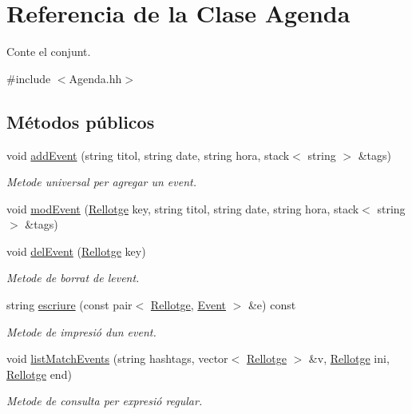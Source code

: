 \hypertarget{class_agenda}{}\section{Referencia de la Clase Agenda}
\label{class_agenda}


Conte el conjunt.  




{\ttfamily \#include $<$Agenda.\+hh$>$}

\subsection*{Métodos públicos}
\begin{DoxyCompactItemize}
\item 
void \hyperlink{class_agenda_a2c929acc7e13b65b5a597b94db249c08}{add\+Event} (string titol, string date, string hora, stack$<$ string $>$ \&tags)
\begin{DoxyCompactList}\small\item\em Metode universal per agregar un event. \end{DoxyCompactList}\item 
void \hyperlink{class_agenda_abd4b2a2bb44123f0dafdf9d998503ef6}{mod\+Event} (\hyperlink{class_rellotge}{Rellotge} key, string titol, string date, string hora, stack$<$ string $>$ \&tags)
\item 
void \hyperlink{class_agenda_ae71248c9fc4536a04ee92e4702cf1f64}{del\+Event} (\hyperlink{class_rellotge}{Rellotge} key)
\begin{DoxyCompactList}\small\item\em Metode de borrat de l\textquotesingle{}event. \end{DoxyCompactList}\item 
string \hyperlink{class_agenda_abed56cab5f55439b60937448cc65dabd}{escriure} (const pair$<$ \hyperlink{class_rellotge}{Rellotge}, \hyperlink{class_event}{Event} $>$ \&e) const 
\begin{DoxyCompactList}\small\item\em Metode de impresió d\textquotesingle{}un event. \end{DoxyCompactList}\item 
void \hyperlink{class_agenda_afed634afc41a8eecb28013c42dfd812a}{list\+Match\+Events} (string hashtags, vector$<$ \hyperlink{class_rellotge}{Rellotge} $>$ \&v, \hyperlink{class_rellotge}{Rellotge} ini, \hyperlink{class_rellotge}{Rellotge} end)
\begin{DoxyCompactList}\small\item\em Metode de consulta per expresió regular. \end{DoxyCompactList}\item 

\end{DoxyCompactItemize}
